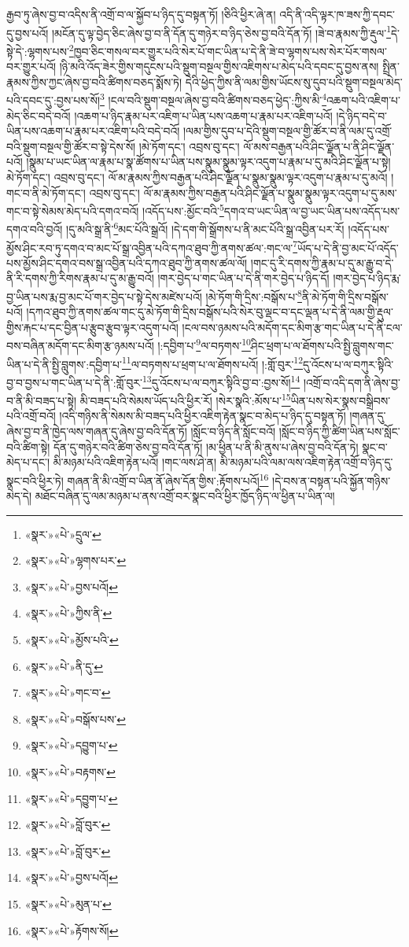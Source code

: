 རྒྱབ་ཏུ་ཞེས་བྱ་བ་འདིས་ནི་འགྲོ་བ་ལ་སྐྱོབ་པ་ཉིད་དུ་བསྟན་ཏོ། །ཅིའི་ཕྱིར་ཞེ་ན། འདི་ནི་འདི་ལྟར་ཁ་ཟས་ཀྱི་དབང་དུ་བྱས་པའོ། །མངོན་དུ་ལྟ་བྱེད་ཅིང་ཞེས་བྱ་བ་ནི་དོན་དུ་གཉེར་བ་ཉིད་ཅེས་བྱ་བའི་དོན་ཏོ། །ཟེ་བ་རྣམས་ཀྱི་རྡུལ་\footnote{«སྣར་»«པེ་»དྲུལ་}དེ་སྟེ་དེ་:ལྷགས་པས་\footnote{«སྣར་»«པེ་»ལྷགས་པར་}ཁྱབ་ཅིང་གསལ་བར་གྱུར་པའི་སེར་པོ་གང་ཡིན་པ་དེ་ནི་ཟེ་བ་ལྷགས་པས་སེར་པོར་གསལ་བར་གྱུར་པའོ། །ཉི་མའི་འོད་ཟེར་གྱིས་གདུངས་པའི་སྡུག་བསྔལ་གྱིས་འཇིགས་པ་མེད་པའི་དབང་དུ་བྱས་ནས། སྤྲིན་རྣམས་ཀྱིས་ཀྱང་ཞེས་བྱ་བའི་ཚིགས་བཅད་སྨོས་ཏེ། དེའི་ཕྱེད་ཀྱིས་ནི་ལམ་གྱིས་ཡོངས་སུ་དུབ་པའི་སྡུག་བསྔལ་མེད་པའི་དབང་དུ་:བྱས་པས་སོ།\footnote{«སྣར་»«པེ་»བྱས་པའོ།} །ངལ་བའི་སྡུག་བསྔལ་ཞེས་བྱ་བའི་ཚིགས་བཅད་ཕྱེད་:ཀྱིས་མི་\footnote{«སྣར་»«པེ་»ཀྱིས་ནི་}འཆག་པའི་འཇིག་པ་མེད་ཅིང་བདེ་བའོ། །འཆག་པ་ཉིད་རྣམ་པར་འཇིག་པ་ཡིན་པས་འཆག་པ་རྣམ་པར་འཇིག་པའོ། །དེ་ཉིད་བདེ་བ་ཡིན་པས་འཆག་པ་རྣམ་པར་འཇིག་པའི་བདེ་བའོ། །ལམ་གྱིས་དུབ་པ་དེའི་སྡུག་བསྔལ་གྱི་ཚོར་བ་ནི་ལམ་དུ་འགྲོ་བའི་སྡུག་བསྔལ་གྱི་ཚོར་བ་སྟེ་དེས་སོ། །མེ་ཏོག་དང་། འབྲས་བུ་དང་། ལོ་མས་བརྒྱན་པའི་ཤིང་ལྗོན་པ་ནི་ཤིང་ལྗོན་པའོ། །སྣུམ་པ་ཡང་ཡིན་ལ་རྣམ་པ་སྣ་ཚོགས་པ་ཡིན་པས་སྣུམ་སྣུམ་ལྟར་འདུག་པ་རྣམ་པ་དུ་མའི་ཤིང་ལྗོན་པ་སྟེ། མེ་ཏོག་དང་། འབྲས་བུ་དང་། ལོ་མ་རྣམས་ཀྱིས་བརྒྱན་པའི་ཤིང་ལྗོན་པ་སྣུམ་སྣུམ་ལྟར་འདུག་པ་རྣམ་པ་དུ་མའོ། །གང་བ་ནི་མེ་ཏོག་དང་། འབྲས་བུ་དང་། ལོ་མ་རྣམས་ཀྱིས་བརྒྱན་པའི་ཤིང་ལྗོན་པ་སྣུམ་སྣུམ་ལྟར་འདུག་པ་དུ་མས་གང་བ་སྟེ་སེམས་མེད་པའི་དགའ་བའོ། །འདོད་པས་:མྱོང་བའི་\footnote{«སྣར་»«པེ་»མྱོས་པའི་}དགའ་བ་ཡང་ཡིན་ལ་བྱ་ཡང་ཡིན་པས་འདོད་པས་དགའ་བའི་བྱའོ། །དུ་མའི་སྒྲ་ནི་\footnote{«སྣར་»«པེ་»ནི་དུ་}མང་པོའི་སྒྲའོ། །དེ་དག་གི་སྒྲོགས་པ་ནི་མང་པོའི་སྒྲ་འབྱིན་པར་རོ། །འདོད་པས་མྱོས་ཤིང་རབ་ཏུ་དགའ་བ་མང་པོ་སྒྲ་འབྱིན་པའི་དཀའ་ཐུབ་ཀྱི་ནགས་ཚལ་:གང་ལ་\footnote{«སྣར་»«པེ་»གང་བ་}ཡོད་པ་དེ་ནི་བྱ་མང་པོ་འདོད་པས་མྱོས་ཤིང་དགའ་བས་སྒྲ་འབྱིན་པའི་དཀའ་ཐུབ་ཀྱི་ནགས་ཚལ་ལོ། །གང་དུ་རི་དགས་ཀྱི་རྣམ་པ་དུ་མ་རྒྱུ་བ་དེ་ནི་རི་དགས་ཀྱི་རིགས་རྣམ་པ་དུ་མ་རྒྱུ་བའོ། །གར་བྱེད་པ་གང་ཡིན་པ་དེ་ནི་གར་བྱེད་པ་ཉིད་དོ། །གར་བྱེད་པ་ཉིད་རྨ་བྱ་ཡིན་པས་རྨ་བྱ་མང་པོ་གར་བྱེད་པ་སྟེ་དེས་མཛེས་པའོ། །མེ་ཏོག་གི་དྲིས་:བསྒོས་པ་\footnote{«སྣར་»«པེ་»བསྒོས་པས་}ནི་མེ་ཏོག་གི་དྲིས་བསྒོས་པའོ། །དཀའ་ཐུབ་ཀྱི་ནགས་ཚལ་གང་དུ་མེ་ཏོག་གི་དྲིས་བསྒོས་པའི་སེར་བུ་ལྡང་བ་དང་ལྡན་པ་དེ་ནི་ལམ་གྱི་རྡུལ་གྱིས་རྐང་པ་དང་བྱིན་པ་རྩུབ་རྩུབ་ལྟར་འདུག་པའོ། །ངལ་བས་ཉམས་པའི་མདོག་དང་མིག་རྩ་གང་ཡིན་པ་དེ་ནི་ངལ་བས་བཞིན་མདོག་དང་མིག་རྩ་ཉམས་པའོ། །:དབྱིག་པ་\footnote{«སྣར་»«པེ་»དབྱུག་པ་}ལ་བཏགས་\footnote{«སྣར་»«པེ་»བརྟགས་}ཤིང་ཕྲག་པ་ལ་ཐོགས་པའི་སྤྱི་བླུགས་གང་ཡིན་པ་དེ་ནི་སྤྱི་བླུགས་:དབྱིག་པ་\footnote{«སྣར་»«པེ་»དབྱུག་པ་}ལ་བཏགས་པ་ཕྲག་པ་ལ་ཐོགས་པའོ། །:གློ་བུར་\footnote{«སྣར་»«པེ་»བློ་བུར་}དུ་འོངས་པ་ལ་བཀུར་སྟིའི་བྱ་བ་བྱས་པ་གང་ཡིན་པ་དེ་ནི་:གློ་བུར་\footnote{«སྣར་»«པེ་»བློ་བུར་}དུ་འོངས་པ་ལ་བཀུར་སྟིའི་བྱ་བ་:བྱས་སོ།\footnote{«སྣར་»«པེ་»བྱས་པའོ།} །འགྲོ་བ་འདི་དག་ནི་ཞེས་བྱ་བ་ནི་མི་བཟད་པ་སྟེ། མི་བཟད་པའི་སེམས་ཡོད་པའི་ཕྱིར་རོ། །སེར་སྣའི་:མོས་པ་\footnote{«སྣར་»«པེ་»མུན་པ་}ཡིན་པས་སེར་སྣས་བསྒྲིབས་པའི་འགྲོ་བའོ། །འདི་གཉིས་ནི་སེམས་མི་བཟད་པའི་ཕྱིར་འཇིག་རྟེན་སྣང་བ་མེད་པ་ཉིད་དུ་བསྟན་ཏོ། །གཞན་དུ་ཞེས་བྱ་བ་ནི་ཁྱེད་ལས་གཞན་དུ་ཞེས་བྱ་བའི་དོན་ཏོ། །སློང་བ་ཉིད་ནི་སློང་བའོ། །སློང་བ་ཉིད་ཀྱི་ཚིག་ཡིན་པས་སློང་བའི་ཚིག་སྟེ། དོན་དུ་གཉེར་བའི་ཚིག་ཅེས་བྱ་བའི་དོན་ཏོ། །མ་ཕྱིན་པ་ནི་མི་ནུས་པ་ཞེས་བྱ་བའི་དོན་ཏེ། སྣང་བ་མེད་པ་དང་། མི་མཉམ་པའི་འཇིག་རྟེན་པའོ། །གང་ལས་ཤེ་ན། མི་མཉམ་པའི་ལམ་ལས་འཇིག་རྟེན་འགྲོ་བ་ཉིད་དུ་སྣང་བའི་ཕྱིར་ཏེ། གཞན་ནི་མི་འགྲོ་བ་ཡིན་ནོ་ཞེས་དོན་གྱིས་:རྟོགས་པའོ།\footnote{«སྣར་»«པེ་»རྟོགས་སོ།} །དེ་བས་ན་བསྟན་པའི་སྐྱོན་གཉིས་མེད་དེ། མཐོང་བཞིན་དུ་ལམ་མཉམ་པ་ནས་འགྲོ་བར་སྣང་བའི་ཕྱིར་ཁྱོད་ཉིད་ལ་ཕྱིན་པ་ཡིན་ལ། 